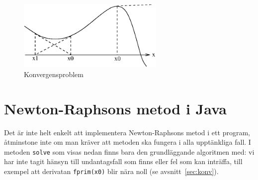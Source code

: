 \documentclass[a4paper]{article}
\begin{document}
\begin{figure}[b]
   \begin{center}
      \includegraphics[width=70mm]{konvbild}
   \end{center}
   \caption{Konvergensproblem}
   \label{konvbild}
\end{figure}



\section{Newton-Raphsons metod i Java}

Det är inte helt enkelt att implementera Newton-Raphsons metod i ett
program, åtminstone inte om man kräver att metoden ska fungera i
alla upptänkliga fall.  I metoden \texttt{solve} som visas nedan finns bara
den grundläggande algoritmen med: vi har inte tagit hänsyn till
undantagsfall som finns eller fel som kan inträffa, till exempel
att derivatan \texttt{fprim(x0)} blir nära noll (se avsnitt~\ref{sec:konv}).

\end{document}
